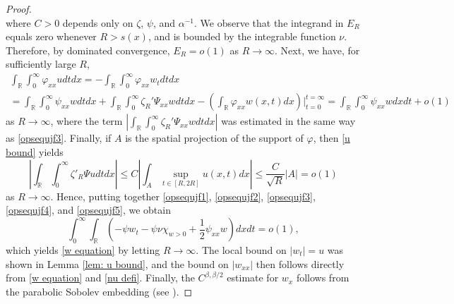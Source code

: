 \documentclass{article}
\numberwithin{equation}{section}
\numberwithin{figure}{section}
\theoremstyle{plain}
\theoremstyle{plain}
\theoremstyle{plain}
\theoremstyle{plain}
\theoremstyle{definition}
\theoremstyle{remark}
\def\R{{\mathbb{R}}}
\begin{document}
\begin{proof}
\begin{equation}
\end{equation}
where $C>0$ depends only on $\zeta$, $\psi$, and $\alpha^{-1}$. We observe that the integrand in $E_R$ equals zero whenever $R>s(x)$, and is bounded by the integrable function $\nu$. Therefore, by dominated convergence, $E_R=o(1)$ as $R\to \infty$. Next, we have, for sufficiently large $R$,
\begin{multline}\label{opsequjf4}
\int_{\R}\int_{0}^{\infty}\varphi_{xx}udtdx=-\int_{\R}\int_{0}^{\infty}\varphi_{xx}w_tdtdx\\=\int_{\R}\int_0^{\infty}\psi_{xx}wdtdx +\int_{\R}\int_0^{\infty}\zeta_R'\Psi_{xx}wdtdx -\left(\int_{\R} \varphi_{xx}w(x,t)dx\right) \Biggr \rvert_{t=0}^{t=\infty}=\int_{\R}\int_0^{\infty}\psi_{xx}wdxdt+o(1)
\end{multline}
as $R\to \infty$, where the term $\left|\int_{\R}\int_0^{\infty}\zeta_R'\Psi_{xx}wdtdx \right|$ was estimated in the same way as \eqref{opsequjf3}.
Finally, if $A$ is the spatial projection of the support of $\varphi$, then \eqref{u bound} yields
\begin{equation}\label{opsequjf5}
    \left| \int_{\R} \int_{0}^{\infty} \zeta'_R\Psi u dtdx\right| \leq C \left| \int_{A} \sup_{t\in[R,2R]}u(x,t)dx \right|\leq \frac{C}{\sqrt{R}} \left| A \right| =o(1)
\end{equation}
as $R\to \infty$. Hence, putting together \eqref{opsequjf1}, \eqref{opsequjf2}, \eqref{opsequjf3}, \eqref{opsequjf4}, and \eqref{opsequjf5}, we obtain
\begin{equation}
     \int_{0}^{\infty}\int_{\R} \left( -\psi w_t-\psi\nu \chi_{w>0}+\frac{1}{2}\psi_{xx}w\right)dxdt=o(1),
\end{equation}
which yields \eqref{w equation} by letting $R \to \infty$. The local bound on $|w_t|=u$ was shown in Lemma \ref{lem: u bound}, and  the bound on $|w_{xx}|$ then follows directly from \eqref{w equation} and \eqref{nu defi}. Finally, the $C^{\beta,\beta/2}$ estimate for $w_x$ follows from the parabolic Sobolev embedding (see \cite[Ch. II, Lem. 3.3]{ladyzhenskaya}).
\end{proof}
\end{document}
